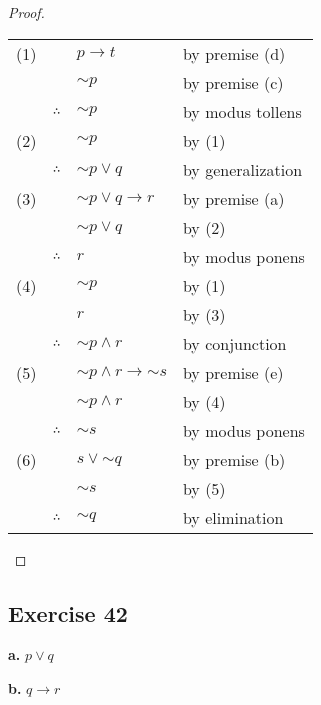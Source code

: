 \documentclass[14pt]{extarticle}
\begin{document}
\begin{proof}
    \begin{tabular}{rrll}
        (1) &              & $p \to t$                        & by premise (d)    \\
            &              & ${\sim p}$                       & by premise (c)    \\ & $\therefore$ & ${\sim p}$ & by modus tollens \\
        (2) &              & ${\sim p}$                       & by (1)            \\
            & $\therefore$ & ${\sim p} \vee q$                & by generalization \\
        (3) &              & ${\sim p} \vee q \to r$          & by premise (a)    \\
            &              & ${\sim p} \vee q$                & by (2)            \\
            & $\therefore$ & $r$                              & by modus ponens   \\
        (4) &              & ${\sim p}$                       & by (1)            \\
            &              & $r$                              & by (3)            \\
            & $\therefore$ & ${\sim p} \wedge r$              & by conjunction    \\
        (5) &              & ${\sim p} \wedge r \to {\sim s}$ & by premise (e)    \\
            &              & ${\sim p} \wedge r$              & by (4)            \\ & $\therefore$ & ${\sim s}$ & by modus ponens \\
        (6) &              & $s \vee {\sim q}$                & by premise (b)    \\
            &              & ${\sim s}$                       & by (5)            \\
            & $\therefore$ & ${\sim q}$                       & by elimination    \\
    \end{tabular}
\end{proof}

\subsection{Exercise 42}
{\bf a.} $p \vee q$

{\bf b.} $q \to r$
\end{document}
